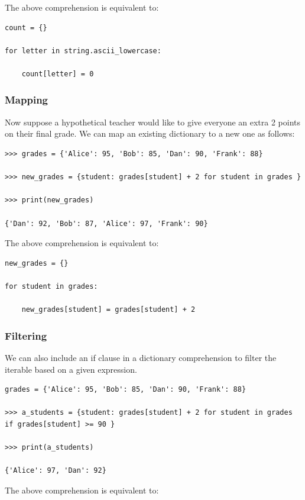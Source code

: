 \documentclass{article}
\begin{document}
The above comprehension is equivalent to: 

\begin{lstlisting}
count = {} 

for letter in string.ascii_lowercase: 

    count[letter] = 0
\end{lstlisting}

\subsubsection{Mapping}

Now suppose a hypothetical teacher would like to give everyone an extra 2 points on their final grade. We can map an existing dictionary to a new one as follows: 

\begin{lstlisting}
>>> grades = {'Alice': 95, 'Bob': 85, 'Dan': 90, 'Frank': 88} 

>>> new_grades = {student: grades[student] + 2 for student in grades } 

>>> print(new_grades) 

{'Dan': 92, 'Bob': 87, 'Alice': 97, 'Frank': 90} 
\end{lstlisting}

The above comprehension is equivalent to: 

\begin{lstlisting}
new_grades = {} 

for student in grades: 

    new_grades[student] = grades[student] + 2
\end{lstlisting}

\subsubsection{Filtering}

We can also include an if clause in a dictionary comprehension to filter the iterable based on a given expression. 

\begin{lstlisting}
grades = {'Alice': 95, 'Bob': 85, 'Dan': 90, 'Frank': 88} 

>>> a_students = {student: grades[student] + 2 for student in grades if grades[student] >= 90 } 

>>> print(a_students) 

{'Alice': 97, 'Dan': 92} 
\end{lstlisting}

The above comprehension is equivalent to: 
\end{document}
